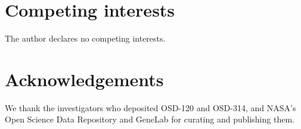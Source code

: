 \documentclass[11pt,a4paper]{article}
\begin{document}
\section*{Competing interests}
The author declares no competing interests.

\section*{Acknowledgements}
We thank the investigators who deposited OSD-120 and OSD-314, and NASA's Open Science
Data Repository and GeneLab for curating and publishing them.



\end{document}
